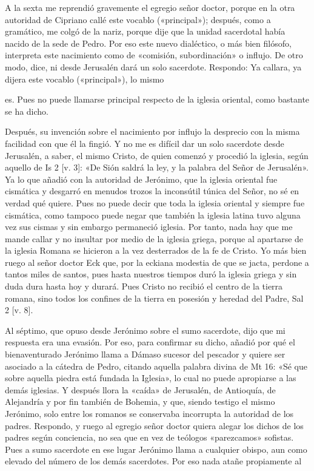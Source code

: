 A la sexta me reprendió gravemente el egregio señor doctor, porque en la otra autoridad de Cipriano callé este vocablo («principal»); después, como a gramático, me colgó de la nariz, porque dije que la unidad sacerdotal había nacido de la sede de Pedro. Por eso este nuevo dialéctico, o más bien filósofo, interpreta este nacimiento como de «comisión, subordinación» o influjo. De otro modo, dice, ni desde Jerusalén dará un solo sacerdote. Respondo: Ya callara, ya dijera este vocablo («principal»), lo mismo

es. Pues no puede llamarse principal respecto de la iglesia oriental, como bastante se ha dicho.

Después, su invención sobre el nacimiento por influjo la desprecio con la misma facilidad con que él la fingió. Y no me es difícil dar un solo sacerdote desde Jerusalén, a saber, el mismo Cristo, de quien comenzó y procedió la iglesia, según aquello de Is 2 [v. 3]: «De Sión saldrá la ley, y la palabra del Señor de Jerusalén». Ya lo que añadió con la autoridad de Jerónimo, que la iglesia oriental fue cismática y desgarró en menudos trozos la inconsútil túnica del Señor, no sé en verdad qué quiere. Pues no puede decir que toda la iglesia oriental y siempre fue \marginpar{\small[266]} cismática, como tampoco puede negar que también la iglesia latina tuvo alguna vez sus cismas y sin embargo permaneció iglesia. Por tanto, nada hay que me mande callar y no insultar por medio de la iglesia griega, porque al apartarse de la iglesia Romana se hicieron a la vez desterrados de la fe de Cristo. Yo más bien ruego al señor doctor Eck que, por la eckiana modestia de que se jacta, perdone a tantos miles de santos, pues hasta nuestros tiempos duró la iglesia griega y sin duda dura hasta hoy y durará. Pues Cristo no recibió el centro de la tierra romana, sino todos los confines de la tierra en posesión y heredad del Padre, Sal 2 [v. 8].

Al séptimo, que opuso desde Jerónimo sobre el sumo sacerdote, dijo que mi respuesta era una evasión. Por eso, para confirmar su dicho, añadió por qué el bienaventurado Jerónimo llama a Dámaso sucesor del pescador y quiere ser asociado a la cátedra de Pedro, citando aquella palabra divina de Mt 16: «Sé que sobre aquella piedra está fundada la Iglesia», lo cual no puede apropiarse a las demás iglesias. Y después llora la «caída» de Jerusalén, de Antioquía, de Alejandría y por fin también de Bohemia, y que, siendo testigo el mismo Jerónimo, solo entre los romanos se conservaba incorrupta la autoridad de los padres. Respondo, y ruego al egregio señor doctor quiera alegar los dichos de los padres según conciencia, no sea que en vez de teólogos «parezcamos» sofistas. Pues a sumo sacerdote en ese lugar Jerónimo llama a cualquier obispo, aun como elevado del número de los demás sacerdotes. Por eso nada atañe propiamente al

